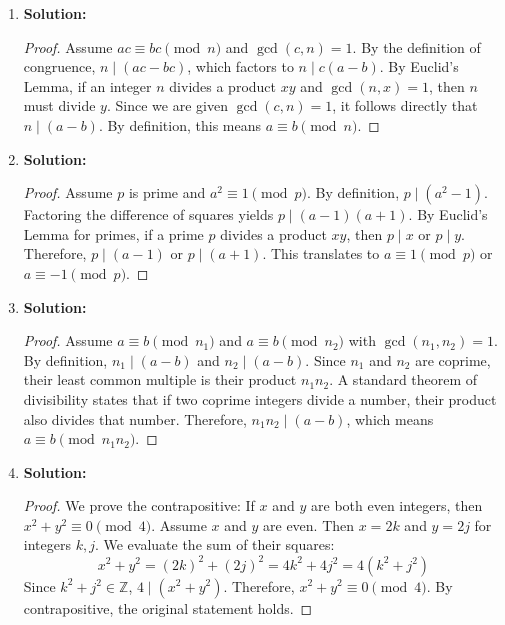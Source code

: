 \documentclass{article}
\begin{document}
\begin{enumerate}
    \item \textbf{Solution:}
    \begin{proof}
        Assume $ac \equiv bc \pmod n$ and $\gcd(c, n) = 1$. By the definition of congruence, $n \mid (ac - bc)$, which factors to $n \mid c(a - b)$. By Euclid's Lemma, if an integer $n$ divides a product $xy$ and $\gcd(n, x) = 1$, then $n$ must divide $y$. Since we are given $\gcd(c, n) = 1$, it follows directly that $n \mid (a - b)$. By definition, this means $a \equiv b \pmod n$.
    \end{proof}

    \item \textbf{Solution:}
    \begin{proof}
        Assume $p$ is prime and $a^2 \equiv 1 \pmod p$. By definition, $p \mid (a^2 - 1)$. Factoring the difference of squares yields $p \mid (a - 1)(a + 1)$. By Euclid's Lemma for primes, if a prime $p$ divides a product $xy$, then $p \mid x$ or $p \mid y$. Therefore, $p \mid (a - 1)$ or $p \mid (a + 1)$. This translates to $a \equiv 1 \pmod p$ or $a \equiv -1 \pmod p$.
    \end{proof}

    \item \textbf{Solution:}
    \begin{proof}
        Assume $a \equiv b \pmod{n_1}$ and $a \equiv b \pmod{n_2}$ with $\gcd(n_1, n_2) = 1$. By definition, $n_1 \mid (a - b)$ and $n_2 \mid (a - b)$. Since $n_1$ and $n_2$ are coprime, their least common multiple is their product $n_1 n_2$. A standard theorem of divisibility states that if two coprime integers divide a number, their product also divides that number. Therefore, $n_1 n_2 \mid (a - b)$, which means $a \equiv b \pmod{n_1 n_2}$.
    \end{proof}

    \item \textbf{Solution:}
    \begin{proof}
        We prove the contrapositive: If $x$ and $y$ are both even integers, then $x^2 + y^2 \equiv 0 \pmod 4$. Assume $x$ and $y$ are even. Then $x = 2k$ and $y = 2j$ for integers $k, j$. We evaluate the sum of their squares:
        \[ x^2 + y^2 = (2k)^2 + (2j)^2 = 4k^2 + 4j^2 = 4(k^2 + j^2) \]
        Since $k^2 + j^2 \in \mathbb{Z}$, $4 \mid (x^2 + y^2)$. Therefore, $x^2 + y^2 \equiv 0 \pmod 4$. By contrapositive, the original statement holds.
    \end{proof}


\end{enumerate}
\end{document}
